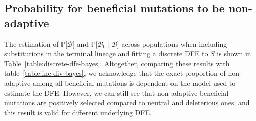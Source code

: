 \documentclass{article}
\newcommand{\proba}{\mathbb{P}}
\newcommand{\SphyBen}{\mathcal{B}_0}
\newcommand{\given}{\mid}
\newcommand{\Spop}{S}
\newcommand{\SpopBen}{\mathcal{B}}
\begin{document}
    \subsection{Probability for beneficial mutations to be non-adaptive}
    The estimation of $\proba{[} \SpopBen {]}$ and $\proba{[}\SphyBen\given \SpopBen {]}$ across populations when including substitutions in the terminal lineage and fitting a discrete DFE to $\Spop$ is shown in Table~\ref{table:discrete-dfe-bayes}.
    Altogether, comparing these results with table~\ref{table:inc-div-bayes}, we acknowledge that the exact proportion of non-adaptive among all beneficial mutations is dependent on the model used to estimate the DFE.
    However, we can still see that non-adaptive beneficial mutations are positively selected compared to neutral and deleterious ones, and this result is valid for different underlying DFE.
    \newpage
\end{document}

